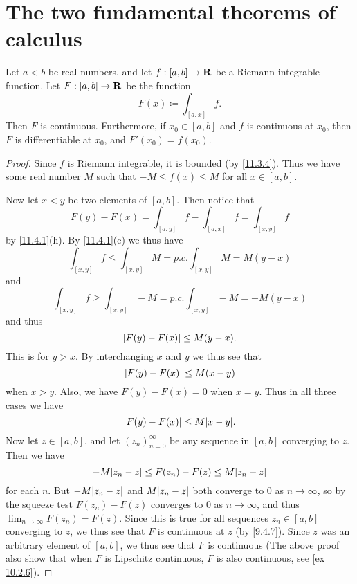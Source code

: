 \section{The two fundamental theorems of calculus}\label{sec 11.9}

\begin{theorem}\label{11.9.1}
  Let \(a < b\) be real numbers, and let \(f : [a, b] \to \mathbf{R}\) be a Riemann integrable function.
  Let \(F : [a, b] \to \mathbf{R}\) be the function
  \[
    F(x) \coloneqq \int_{[a, x]} f.
  \]
  Then \(F\) is continuous.
  Furthermore, if \(x_0 \in [a, b]\) and \(f\) is continuous at \(x_0\), then \(F\) is differentiable at \(x_0\), and \(F'(x_0) = f(x_0)\).
\end{theorem}

\begin{proof}
  Since \(f\) is Riemann integrable, it is bounded (by \cref{11.3.4}).
  Thus we have some real number \(M\) such that \(-M \leq f(x) \leq M\) for all \(x \in [a, b]\).

  Now let \(x < y\) be two elements of \([a, b]\).
  Then notice that
  \[
    F(y) - F(x) = \int_{[a, y]} f - \int_{[a, x]} f = \int_{[x, y]} f
  \]
  by \cref{11.4.1}(h).
  By \cref{11.4.1}(e) we thus have
  \[
    \int_{[x, y]} f \leq \int_{[x, y]} M = p.c. \int_{[x, y]} M = M(y - x)
  \]
  and
  \[
    \int_{[x, y]} f \geq \int_{[x, y]} -M = p.c. \int_{[x, y]} -M = -M(y - x)
  \]
  and thus
  \[
    \left\lvert F(y) - F(x)\right\rvert \leq M(y - x).
  \]
  This is for \(y > x\).
  By interchanging \(x\) and \(y\) we thus see that
  \[
    \left\lvert F(y) - F(x)\right\rvert \leq M(x - y)
  \]
  when \(x > y\).
  Also, we have \(F(y) - F(x) = 0\) when \(x = y\).
  Thus in all
  three cases we have
  \[
    \abs{F(y) - F(x)} \leq M \abs{x - y}.
  \]
  Now let \(z \in [a, b]\), and let \((z_n)_{n = 0}^\infty\) be any sequence in \([a, b]\) converging to \(z\).
  Then we have
  \[
    -M \abs{z_n - z} \leq F(z_n) - F(z) \leq M \abs{z_n - z}
  \]
  for each \(n\).
  But \(-M \abs{z_n - z}\) and \(M \abs{z_n - z}\) both converge to \(0\) as \(n \to \infty\), so by the squeeze test \(F(z_n) - F(z)\) converges to \(0\) as \(n \to \infty\), and thus \(\lim_{n \to \infty} F(z_n) = F(z)\).
  Since this is true for all sequences \(z_n \in [a, b]\) converging to \(z\), we thus see that \(F\) is continuous at \(z\) (by \cref{9.4.7}).
  Since \(z\) was an arbitrary element of \([a, b]\), we thus see that \(F\) is continuous
  (The above proof also show that when \(F\) is Lipschitz continuous, \(F\) is also continuous, see \cref{ex 10.2.6}).


\end{proof}
